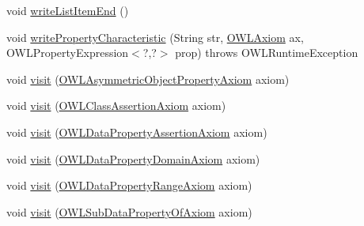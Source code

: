 \begin{DoxyCompactItemize}
void \hyperlink{classuk_1_1ac_1_1manchester_1_1owl_1_1owlapi_1_1tutorial_1_1io_1_1_o_w_l_tutorial_syntax_object_renderer_a9f823090c000bb0fb231de0d3eeab8ee}{write\-List\-Item\-End} ()
\item 
void \hyperlink{classuk_1_1ac_1_1manchester_1_1owl_1_1owlapi_1_1tutorial_1_1io_1_1_o_w_l_tutorial_syntax_object_renderer_a51cdb9592bd5e860a23504bbb82437a8}{write\-Property\-Characteristic} (String str, \hyperlink{interfaceorg_1_1semanticweb_1_1owlapi_1_1model_1_1_o_w_l_axiom}{O\-W\-L\-Axiom} ax, O\-W\-L\-Property\-Expression$<$?,?$>$ prop)  throws O\-W\-L\-Runtime\-Exception 
\item 
void \hyperlink{classuk_1_1ac_1_1manchester_1_1owl_1_1owlapi_1_1tutorial_1_1io_1_1_o_w_l_tutorial_syntax_object_renderer_ae117dc60394e220f4a7885c94d33475f}{visit} (\hyperlink{interfaceorg_1_1semanticweb_1_1owlapi_1_1model_1_1_o_w_l_asymmetric_object_property_axiom}{O\-W\-L\-Asymmetric\-Object\-Property\-Axiom} axiom)
\item 
void \hyperlink{classuk_1_1ac_1_1manchester_1_1owl_1_1owlapi_1_1tutorial_1_1io_1_1_o_w_l_tutorial_syntax_object_renderer_a578c0605dff1621b1b7946fcd42b10cf}{visit} (\hyperlink{interfaceorg_1_1semanticweb_1_1owlapi_1_1model_1_1_o_w_l_class_assertion_axiom}{O\-W\-L\-Class\-Assertion\-Axiom} axiom)
\item 
void \hyperlink{classuk_1_1ac_1_1manchester_1_1owl_1_1owlapi_1_1tutorial_1_1io_1_1_o_w_l_tutorial_syntax_object_renderer_ae380f1ce86474e8d89f5009c2cadf552}{visit} (\hyperlink{interfaceorg_1_1semanticweb_1_1owlapi_1_1model_1_1_o_w_l_data_property_assertion_axiom}{O\-W\-L\-Data\-Property\-Assertion\-Axiom} axiom)
\item 
void \hyperlink{classuk_1_1ac_1_1manchester_1_1owl_1_1owlapi_1_1tutorial_1_1io_1_1_o_w_l_tutorial_syntax_object_renderer_a082ec27b742c14b4b1223c0672aac46f}{visit} (\hyperlink{interfaceorg_1_1semanticweb_1_1owlapi_1_1model_1_1_o_w_l_data_property_domain_axiom}{O\-W\-L\-Data\-Property\-Domain\-Axiom} axiom)
\item 
void \hyperlink{classuk_1_1ac_1_1manchester_1_1owl_1_1owlapi_1_1tutorial_1_1io_1_1_o_w_l_tutorial_syntax_object_renderer_a17339bc6f0e67246dc584c0cfd4ba81b}{visit} (\hyperlink{interfaceorg_1_1semanticweb_1_1owlapi_1_1model_1_1_o_w_l_data_property_range_axiom}{O\-W\-L\-Data\-Property\-Range\-Axiom} axiom)
\item 
void \hyperlink{classuk_1_1ac_1_1manchester_1_1owl_1_1owlapi_1_1tutorial_1_1io_1_1_o_w_l_tutorial_syntax_object_renderer_a3e45c7ec8acf03205ef400f5ccf4f6ba}{visit} (\hyperlink{interfaceorg_1_1semanticweb_1_1owlapi_1_1model_1_1_o_w_l_sub_data_property_of_axiom}{O\-W\-L\-Sub\-Data\-Property\-Of\-Axiom} axiom)

\end{DoxyCompactItemize}
